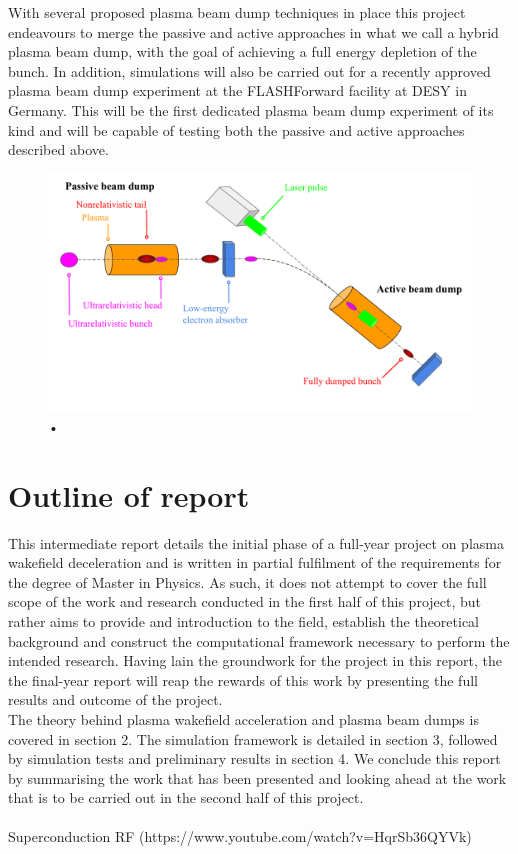 With several proposed plasma beam dump techniques in place this project endeavours to merge the passive and active approaches in what we call a hybrid plasma beam dump, with the goal of achieving a full energy depletion of the bunch. In addition, simulations will also be carried out for a recently approved plasma beam dump experiment at the FLASHForward facility at DESY in Germany. This will be the first dedicated plasma beam dump experiment of its kind and will be capable of testing both the passive and active approaches described above. 
\begin{figure}
\centering
\includegraphics[width=\textwidth]{hybrid_outline3.pdf}
\caption{•}
\end{figure}
\section{Outline of report}
This intermediate report details the initial phase of a full-year project on plasma wakefield deceleration and is written in partial fulfilment of the requirements for the degree of Master in Physics. As such, it does not attempt to cover the full scope of the work and research conducted in the first half of this project, but rather aims to provide and introduction to the field, establish the theoretical background and construct the computational framework necessary to perform the intended research. Having lain the groundwork for the project in this report, the the final-year report will reap the rewards of this work by presenting the full results and outcome of the project.\\
The theory behind plasma wakefield acceleration and plasma beam dumps is covered in section 2. The simulation framework is detailed in section 3, followed by simulation tests and preliminary results in section 4. We conclude this report by summarising the work that has been presented and looking ahead at the work that is to be carried out in the second half of this project.
\\
\\
Superconduction RF (https://www.youtube.com/watch?v=HqrSb36QYVk)